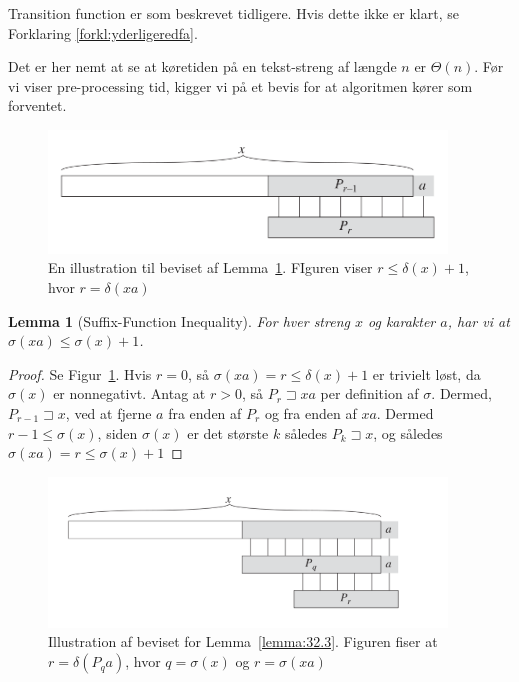 \documentclass[11pt]{article}
\newtheorem{lemma}[theorem]{Lemma}
\theoremstyle{definition}
\theoremstyle{remark}
\begin{document}
Transition function er som beskrevet tidligere. Hvis dette ikke er klart, se Forklaring \ref{forkl:yderligeredfa}.

Det er her nemt at se at køretiden på en tekst-streng af længde $n$ er $\Theta(n)$.
Før vi viser pre-processing tid, kigger vi på et bevis for at algoritmen kører som forventet.


\begin{figure}[ht]
  \centering
\includegraphics[width=300pt]{32.8.png}  
  \caption{\label{fig:32.8} En illustration til beviset af Lemma~\ref{lemma:suffixfunctioninequality}. FIguren viser $r \leq \delta(x) + 1$, hvor $r = \delta(xa)$}
\end{figure}


\begin{lemma}[Suffix-Function Inequality]
  \label{lemma:suffixfunctioninequality}
  For hver streng $x$ og karakter $a$, har vi at $\sigma(xa) \leq \sigma(x) + 1$.
\end{lemma}

\begin{proof}
Se Figur~\ref{fig:32.8}. Hvis $r = 0$, så $\sigma(xa) = r \leq \delta(x) + 1$ er trivielt løst, da $\sigma(x)$ er nonnegativt. Antag at $r > 0$, så $P_{r} \sqsupset xa$ per definition af $\sigma$. Dermed, $P_{r-1} \sqsupset x$, ved at fjerne $a$ fra enden af $P_{r}$ og fra enden af $xa$. Dermed $r-1 \leq \sigma(x)$, siden $\sigma(x)$ er det største $k$ således $P_{k} \sqsupset x$, og således $\sigma(xa) = r \leq \sigma(x) + 1$
\end{proof}

\begin{figure}[ht]
  \centering
\includegraphics[width=300pt]{32.9.png}
  \caption{\label{fig:32.3} Illustration af beviset for Lemma~\ref{lemma:32.3}. Figuren fiser at $r = \delta(P_{q}a)$, hvor $q = \sigma(x)$ og $r = \sigma(xa)$}
\end{figure}
\end{document}
